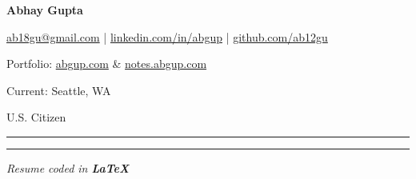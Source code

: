 
{
    \setmainfont{Tinos}
    \fontsize{35}{60}\textbf{Abhay Gupta}
}
\vspace{-11ex}

\begin{flushright} \bfseries
    \par \href{mailto:ab18gu@gmail.com}{ab18gu@gmail.com} | \href{https://linkedin.com/in/abgup}{linkedin.com/in/abgup} | \href{https://github.com/ab12gu}{github.com/ab12gu}
    \par {\mdseries Portfolio:} \href{https://abgup.com}{abgup.com} \& \href{https://notes.abgup.com}{notes.abgup.com}
    \par {\mdseries Current:} \textcolor{mygreen}{Seattle, WA}
    \par {\mdseries U.S. Citizen}
\end{flushright}

\hrule\hrule

\vspace{0.5em}
{\color{bluebell}\itshape \hfill Resume coded in {\bfseries LaTeX}}
\vspace{-1em}